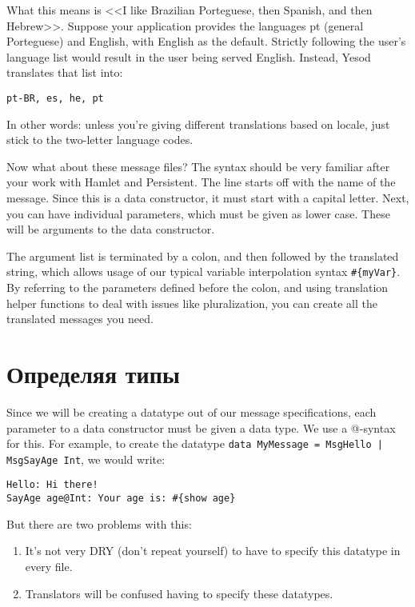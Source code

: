 What this means is <<I like Brazilian Porteguese, then Spanish, and then Hebrew>>. Suppose your application provides the languages pt (general Porteguese) and English, with English as the default. Strictly following the user's language list would result in the user being served English. Instead, Yesod translates that list into:

\begin{lstlisting}
pt-BR, es, he, pt
\end{lstlisting}

In other words: unless you're giving different translations based on locale, just stick to the two-letter language codes.

Now what about these message files? The syntax should be very familiar after your work with Hamlet and Persistent. The line starts off with the name of the message. Since this is a data constructor, it must start with a capital letter. Next, you can have individual parameters, which must be given as lower case. These will be arguments to the data constructor.

The argument list is terminated by a colon, and then followed by the translated string, which allows usage of our typical variable interpolation syntax \lstinline'#{myVar}'. By referring to the parameters defined before the colon, and using translation helper functions to deal with issues like pluralization, you can create all the translated messages you need.

\section{Определяя типы} %

Since we will be creating a datatype out of our message specifications, each parameter to a data constructor must be given a data type. We use a @-syntax for this. For example, to create the datatype \lstinline'data MyMessage = MsgHello | MsgSayAge Int', we would write:

\begin{lstlisting}
Hello: Hi there!
SayAge age@Int: Your age is: #{show age}
\end{lstlisting}

But there are two problems with this:

\begin{enumerate}
  \item It's not very DRY (don't repeat yourself) to have to specify this datatype in every file.
  \item Translators will be confused having to specify these datatypes.
\end{enumerate}

